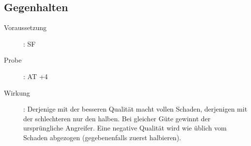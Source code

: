 \subsection{Gegenhalten}
\label{reaktion.gegenhalten}
\begin{description}
    \item[Voraussetzung]:
        SF 
    \item[Probe]: AT +4
    \item[Wirkung]:
        Derjenige mit der besseren Qualität macht vollen Schaden, derjenigen mit der schlechteren nur den halben.
        Bei gleicher Güte gewinnt der ursprüngliche Angreifer.
        Eine negative Qualität wird wie üblich vom Schaden abgezogen (gegebenenfalls zuerst halbieren).
\end{description}
